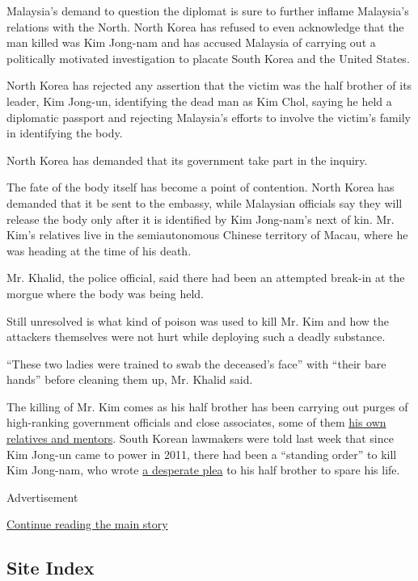 Malaysia's demand to question the diplomat is sure to further inflame
Malaysia's relations with the North. North Korea has refused to even
acknowledge that the man killed was Kim Jong-nam and has accused
Malaysia of carrying out a politically motivated investigation to
placate South Korea and the United States.

North Korea has rejected any assertion that the victim was the half
brother of its leader, Kim Jong-un, identifying the dead man as Kim
Chol, saying he held a diplomatic passport and rejecting Malaysia's
efforts to involve the victim's family in identifying the body.

North Korea has demanded that its government take part in the inquiry.

The fate of the body itself has become a point of contention. North
Korea has demanded that it be sent to the embassy, while Malaysian
officials say they will release the body only after it is identified by
Kim Jong-nam's next of kin. Mr. Kim's relatives live in the
semiautonomous Chinese territory of Macau, where he was heading at the
time of his death.

Mr. Khalid, the police official, said there had been an attempted
break-in at the morgue where the body was being held.

Still unresolved is what kind of poison was used to kill Mr. Kim and how
the attackers themselves were not hurt while deploying such a deadly
substance.

``These two ladies were trained to swab the deceased's face'' with
``their bare hands'' before cleaning them up, Mr. Khalid said.

The killing of Mr. Kim comes as his half brother has been carrying out
purges of high-ranking government officials and close associates, some
of them
\href{https://www.nytimes3xbfgragh.onion/2017/02/15/world/asia/north-korea-executions-kim-jong-un.html}{his
own relatives and mentors}. South Korean lawmakers were told last week
that since Kim Jong-un came to power in 2011, there had been a
``standing order'' to kill Kim Jong-nam, who wrote
\href{https://www.nytimes3xbfgragh.onion/2017/02/15/world/asia/kim-jong-nam-assassination-north-korea.html}{a
desperate plea} to his half brother to spare his life.

Advertisement

\protect\hyperlink{after-bottom}{Continue reading the main story}

\hypertarget{site-index}{%
\subsection{Site Index}\label{site-index}}

